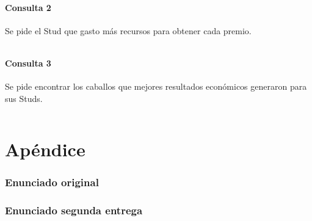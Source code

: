 \documentclass[a4paper,11pt]{article}
\begin{document}
\subsection{Consulta 2}

Se pide el Stud que gasto más recursos para obtener cada premio.

\begin{lstlisting}

\end{lstlisting}

\subsection{Consulta 3}

Se pide encontrar los caballos que mejores resultados económicos generaron para
sus Studs.

\begin{lstlisting}

\end{lstlisting}

\part{Apéndice}
\appendix

\section{Enunciado original}\label{sec:enunciado}


\section{Enunciado segunda entrega}\label{sec:enunciado}

\end{document}
